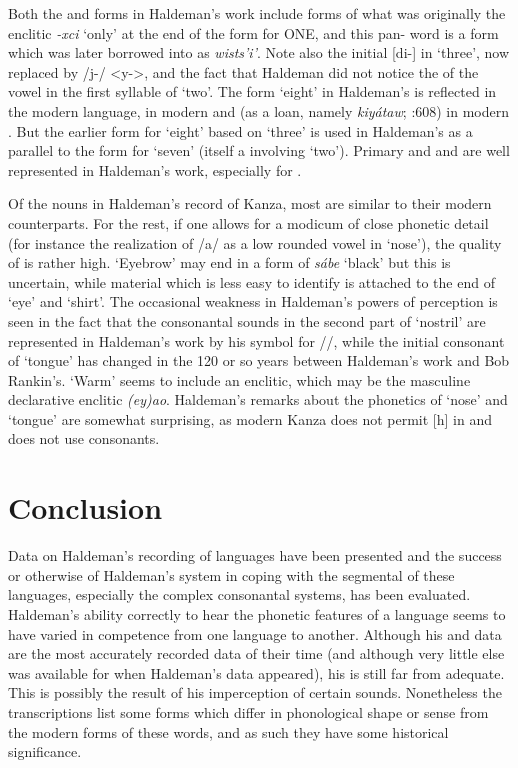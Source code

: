\documentclass[output=paper]{LSP/langsci}
\begin{document}
Both the  and  forms in Haldeman's work include forms of what was originally the enclitic \textit{-xci} `only' at the end of the form for ONE, and this pan- word is a form which was later borrowed into  as \textit{wists'i'}.  Note also the initial [di-] in  `three', now replaced by /j-/ <y->, and the fact that Haldeman did not notice the  of the vowel in the first syllable of  `two'.  The form `eight' in Haldeman's  is reflected in the modern language, in modern  and (as a loan, namely \textit{kiy\'ataw}; \citealt{Rood1996}:608) in modern . But the earlier form for `eight' based on `three' is used in Haldeman's  as a parallel to the form for `seven' (itself a  involving `two'). Primary  and  and  are well represented in Haldeman's work, especially for .  
 

Of the nouns in Haldeman's record of Kanza, most are similar to their modern counterparts.  For the rest, if one allows for a modicum of close phonetic detail (for instance the realization of /a/ as a low rounded vowel in `nose'), the quality of  is rather high. `Eyebrow' may end in a form of \textit{s\'abe} `black' but this is uncertain, while material which is less easy to identify is attached to the end of `eye' and `shirt'.  The occasional weakness in Haldeman's powers of perception is seen in the fact that the consonantal sounds in the second part of `nostril' are represented in Haldeman's work by his symbol for //, while the initial consonant of `tongue' has changed in the 120 or so years between Haldeman's work and Bob Rankin's.  `Warm' seems to include an enclitic, which may be the masculine declarative enclitic \textit{(ey)ao}.  Haldeman's remarks about the phonetics of `nose' and `tongue' are somewhat surprising, as modern Kanza does not permit [h] in  and does not use  consonants.


\section{Conclusion}
 
Data on Haldeman's recording of  languages have been presented and the success or otherwise of Haldeman's system in coping with the segmental  of these languages, especially the complex consonantal systems, has been evaluated. Haldeman's ability correctly to hear the phonetic features of a language seems to have varied in competence from one language to another.  Although his  and  data are the most accurately recorded  data of their time (and although very little else was available for  when Haldeman's data appeared), his  is still far from adequate.  This is possibly the result of his imperception of certain sounds.  Nonetheless the transcriptions list some forms which differ in phonological shape or sense from the modern forms of these words, and as such they have some historical significance. 
 
\end{document}
